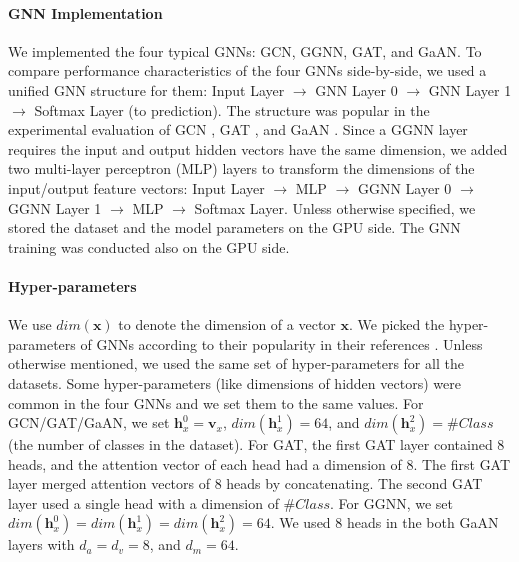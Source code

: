 \paragraph{GNN Implementation}
We implemented the four typical GNNs: GCN, GGNN, GAT, and GaAN.
To compare performance characteristics of the four GNNs side-by-side, we used a unified GNN structure for them: Input Layer $\rightarrow$ GNN Layer 0 $\rightarrow$ GNN Layer 1 $\rightarrow$ Softmax Layer (to prediction).
The structure was popular in the experimental evaluation of GCN \cite{kipf2017_gcn}, GAT \cite{huang2018_gat}, and GaAN \cite{zhang2018_gaan}.
Since a GGNN layer requires the input and output hidden vectors have the same dimension, we added two multi-layer perceptron (MLP) layers to transform the dimensions of the input/output feature vectors: Input Layer $\rightarrow$ MLP $\rightarrow$ GGNN Layer 0 $\rightarrow$ GGNN Layer 1 $\rightarrow$ MLP $\rightarrow$ Softmax Layer.
Unless otherwise specified, we stored the dataset and the model parameters on the GPU side.
The GNN training was conducted also on the GPU side.

\paragraph{Hyper-parameters}
\label{sec:hyper-parameters}

We use $dim(\boldsymbol{x})$ to denote the dimension of a vector $\boldsymbol{x}$.
%
We picked the hyper-parameters of GNNs according to their popularity in their references \cite{kipf2017_gcn, li2015_ggnn, huang2018_gat, zhang2018_gaan}.
%
Unless otherwise mentioned, we used the same set of hyper-parameters for all the datasets. 
%
Some hyper-parameters (like dimensions of hidden vectors) were common in the four GNNs and we set them to the same values.
%
For GCN/GAT/GaAN, we set $\boldsymbol{h}^0_x = \boldsymbol{v}_x$, $dim(\boldsymbol{h}^1_x)=64$, and $dim(\boldsymbol{h}^2_x)=\#Class$ (the number of classes in the dataset).
%
For GAT, the first GAT layer contained 8 heads, and the attention vector of each head had a dimension of 8.
%
The first GAT layer merged attention vectors of 8 heads by concatenating.
%
The second GAT layer used a single head with a dimension of $\#Class$.
%
For GGNN, we set $dim(\boldsymbol{h}^0_x) = dim(\boldsymbol{h}^1_x) = dim(\boldsymbol{h}^2_x) = 64$.
%
We used 8 heads in the both GaAN layers with $d_a=d_v=8$, and $d_m=64$.

